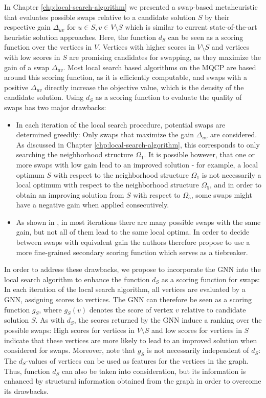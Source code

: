 \documentclass[draft,final]{vutinfth} %
\begin{document}
In Chapter \ref{chp:local-search-algorithm} we presented a swap-based metaheuristic that evaluates possible swaps relative to a candidate solution $S$ by their respective gain $\Delta_{uv}$ for $u \in S, v \in V \setminus S$ which is similar to current state-of-the-art heuristic solution approaches. 
Here, the function $d_S$ can be seen as a scoring function over the vertices in $V$. Vertices with higher scores in $V \setminus S$ and vertices with low scores in $S$ are promising candidates for swapping, as they maximize the gain of a swap $\Delta_{uv}$. 
Most local search based algorithms on the MQCP are based around this scoring function, as it is efficiently computable, and swaps with a positive $\Delta_{uv}$ directly increase the objective value, which is the density of the candidate solution. 
Using $d_S$ as a scoring function to evaluate the quality of swaps has two major drawbacks:
\begin{itemize}
    \item In each iteration of the local search procedure, potential swaps are determined greedily: Only swaps that maximize the gain $\Delta_{uv}$ are considered. As discussed in Chapter \ref{chp:local-search-algorithm}, this corresponds to only searching the neighborhood structure $\Omega_1$. It is possible however, that one or more swaps with low gain lead to an improved solution - for example, a local optimum $S$ with respect to the neighborhood structure $\Omega_1$ is not necessarily a local optimum with respect to the neighborhood structure $\Omega_5$, and in order to obtain an improving solution from $S$ with respect to $\Omega_5$, some swaps might have a negative gain when applied consecutively. 
    \item As shown in \cite{chen_nuqclq_2021}, in most iterations there are many possible swaps with the same gain, but not all of them lead to the same local optima. In order to decide between swaps with equivalent gain the authors therefore propose to use a more fine-grained secondary scoring function which serves as a tiebreaker. 
\end{itemize}

In order to address these drawbacks, we propose to incorporate the GNN into the local search algorithm to enhance the function $d_S$ as a scoring function for swaps: In each iteration of the local search algorithm, all vertices are evaluated by a GNN, assigning scores to vertices. The GNN can therefore be seen as a scoring function $g_S$, where $g_S(v)$ denotes the score of vertex $v$ relative to candidate solution $S$. 
As with $d_S$, the scores returned by the GNN induce a ranking over the possible swaps: High scores for vertices in $V \setminus S$ and low scores for vertices in $S$ indicate that these vertices are more likely to lead to an improved solution when considered for swaps. 
Moreover, note that $g_S$ is not necessarily independent of $d_S$: The $d_S$-values of vertices can be used as features for the vertices in the graph. Thus, function $d_S$ can also be taken into consideration, but its information is enhanced by structural information obtained from the graph in order to overcome its drawbacks. 
\end{document}
